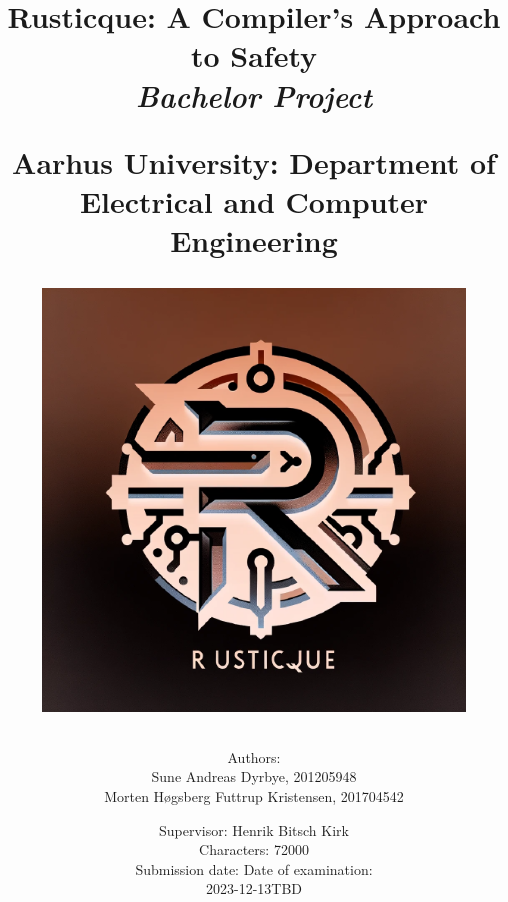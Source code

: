 \newcommand{\authorName}{}
\newcommand{\titleName}{Rusticque: A Compiler's Approach to Safety}
\newcommand{\subject}{Bachelor Project}
\newcommand{\vejleder}{Supervisor: Henrik Bitsch Kirk}
\newcommand{\institute}{Aarhus University: Department of Electrical and Computer Engineering}
\begin{titlepage}
  \centering
    \title
    {
      \Huge \textbf{\titleName}\\
      \scale{\numberSQRTTWO}{\vspace{\sol pt}}
      \LARGE \textit{\subject}
      \scale{\numberSQRTTWO}{\rule{\linewidth}{\sol pt}}

      \textbf{\institute}

      \begin{figure}[h]
        \centering
        \includegraphics[scale=0.50]{02-Body/Images/rusticqueLogo.png}
      \end{figure}

      \author
    {
      \LARGE Authors: \\
      Sune Andreas Dyrbye, 201205948 \\
      Morten Høgsberg Futtrup Kristensen, 201704542 \\
      }
           \date{
        \Large \vejleder \\
        Characters: 72000\\
        \vspace{1em}
        Submission date: \hfill
        Date of examination:\\
        2023-12-13\hfill TBD
      }


    }
   
\end{titlepage}
